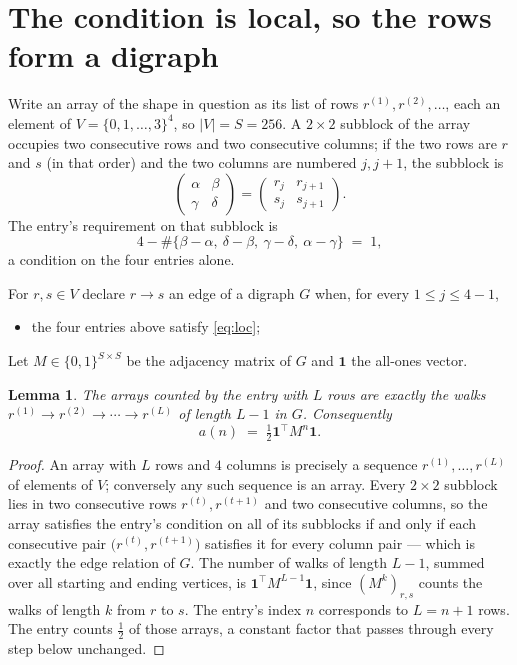 \documentclass[11pt,a4paper]{article}
\theoremstyle{plain}
\newtheorem{lemma}[theorem]{Lemma}
\theoremstyle{definition}
\begin{document}
\section{The condition is local, so the rows form a digraph}

Write an array of the shape in question as its list of rows
$r^{(1)},r^{(2)},\dots$, each an element of
$V=\{0,1,\dots,3\}^{4}$, so $|V|=S=256$. A $2\times2$ subblock of the array
occupies two consecutive rows and two consecutive columns; if the two rows are $r$
and $s$ (in that order) and the two columns are numbered $j,j+1$,
the subblock is
\[
\begin{pmatrix}\alpha&\beta\\\gamma&\delta\end{pmatrix}=\begin{pmatrix}r_j&r_{j+1}\\s_j&s_{j+1}\end{pmatrix}.
\]
The entry's requirement on that subblock is
\begin{equation}\label{eq:loc}
4-\#\{\beta-\alpha,\ \delta-\beta,\ \gamma-\delta,\ \alpha-\gamma\}\;=\;1,
\end{equation}
a condition on the four entries alone.

For $r,s\in V$ declare $r\to s$ an edge of a digraph $G$ when, for every
$1\le j\le 4-1$,
\begin{itemize}
\item the four entries above satisfy \eqref{eq:loc};

\end{itemize}
Let $M\in\{0,1\}^{S\times S}$ be the adjacency matrix of $G$ and $\mathbf{1}$ the
all-ones vector.

\begin{lemma}\label{lem:walk}
The arrays counted by the entry with $L$ rows are exactly the walks
$r^{(1)}\to r^{(2)}\to\cdots\to r^{(L)}$ of length $L-1$ in $G$. Consequently
\[
a(n)\;=\;\tfrac1{2}\mathbf{1}^{\!\top}M^{n}\mathbf{1} .
\]
\end{lemma}

\begin{proof}
An array with $L$ rows and $4$ columns is precisely a sequence
$r^{(1)},\dots,r^{(L)}$ of elements of $V$; conversely any such sequence is an array.
Every $2\times2$ subblock lies in two consecutive rows $r^{(t)},r^{(t+1)}$ and two
consecutive columns, so the array satisfies the entry's condition on all of its subblocks
if and only if each consecutive pair $\bigl(r^{(t)},r^{(t+1)}\bigr)$ satisfies it for
every column pair --- which is exactly the edge relation of $G$. The number of walks of
length $L-1$, summed over all starting and ending vertices, is
$\mathbf{1}^{\!\top}M^{L-1}\mathbf{1}$, since $(M^{k})_{r,s}$ counts the walks of
length $k$ from $r$ to $s$. The entry's index $n$ corresponds to $L=n+1$ rows. The entry counts $\tfrac1{2}$ of those arrays, a constant factor that passes through every step below unchanged.
\end{proof}
\end{document}
